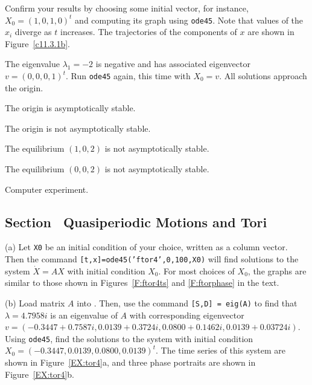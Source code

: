 \documentclass{ximera}
\begin{document}
\para Confirm your results by choosing some initial vector, for instance,
$X_0 = (1,0,1,0)^t$ and computing its graph using {\tt ode45}.  Note that
values of the $x_i$ diverge as $t$ increases.
The trajectories of the components of $x$ are shown in Figure~\ref{c11.3.1b}. 

\para The eigenvalue $\lambda_1 = -2$ is negative and has
associated eigenvector $v = (0,0,0,1)^t$.  Run {\tt ode45} again, this
time with $X_0 = v$.  All solutions approach the origin.

\begin{figure}[htb]
                       \centerline{%
                       }
\end{figure}

  The origin is asymptotically stable. 

\newpage
{}  The origin is not asymptotically stable. 

  The equilibrium $(1,0,2)$ is not asymptotically stable. 

  The equilibrium $(0,0,2)$ is not asymptotically stable. 


  Computer experiment.



\subsection*{Section~\protect{\ref{S:NLD}} Quasiperiodic Motions and Tori}

(a) Let {\tt X0} be an initial condition of your choice, written as a
column vector.  Then the command {\tt [t,x]=ode45('ftor4',0,100,X0)}
will find solutions to the system $\dot{X} = AX$ with initial condition
$X_0$.  For most choices of $X_0$, the graphs are similar to those shown
in Figures~\ref{F:ftor4ts} and \ref{F:ftorphase} in the text.

(b) Load matrix $A$ into \Matlabp.  Then, use the command
{\tt [S,D] = eig(A)} to find that $\lambda = 4.7958i$ is an eigenvalue of
$A$ with corresponding eigenvector $v = (-0.3447 + 0.7587i, 0.0139 +
0.3724i, 0.0800 + 0.1462i, 0.0139 + 0.03724i)$.  Using {\tt ode45}, find
the solutions to the system with initial condition $X_0 = (-0.3447, 0.0139,
0.0800, 0.0139)^t$.  The time series of this system are shown in
Figure~\ref{EX:tor4}a, and three phase portraits are shown in
Figure~\ref{EX:tor4}b.
\end{document}
